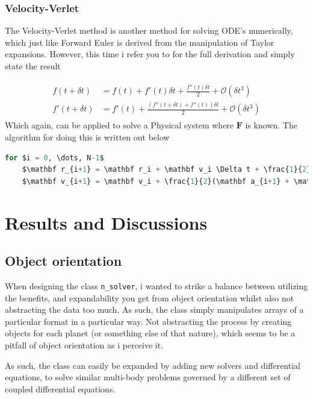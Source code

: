 \documentclass[10pt,showpacs,preprintnumbers,footinbib,amsmath,amssymb,aps,prl,twocolumn,groupedaddress,superscriptaddress,showkeys]{revtex4-1}
\begin{document}
  \subsubsection{Velocity-Verlet}
    The Velocity-Verlet method is another method for solving ODE's numerically, which just like Forward Euler is derived from the manipulation of Taylor expansions. However, this time i refer you to \cite{ode_lecture} for the full derivation and simply state the result

    \begin{align}
      \begin{split}
        f(t + \delta t) &= f(t) + f'(t)\delta t + \frac{f''(t)\delta t}{2} + \mathcal O(\delta t^3) \\
        f'(t + \delta t) &= f'(t) + \frac{\left( f''(t + \delta t) + f''(t) \right)\delta t}{2} + \mathcal O(\delta t^3)
      \end{split}
    \end{align}
    Which again, can be applied to solve a Physical system where $\mathbf F$ is known. The algorithm for doing this is written out below
  \begin{lstlisting}[mathescape=true, language=python, title=Velocity-Verlet Algorithm]
  for $i = 0, \dots, N-1$
    $\mathbf r_{i+1} = \mathbf r_i + \mathbf v_i \Delta t + \frac{1}{2}\mathbf a_i(\Delta t)^2$
    $\mathbf v_{i+1} = \mathbf v_i + \frac{1}{2}(\mathbf a_{i+1} + \mathbf a_i)\Delta t  $
  \end{lstlisting}



\section{Results and Discussions}
  \subsection{Object orientation}
    When designing the class \lstinline{n_solver}, i wanted to strike a balance between utilizing the benefits, and expandability you get from object orientation whilst also not abstracting the data too much. As such, the class simply manipulates arrays of a particular format in a particular way. Not abstracting the process by creating objects for each planet (or something else of that nature), which seems to be a pitfall of object orientation as i perceive it.

    As such, the class can easily be expanded by adding new solvers and differential equations, to solve similar multi-body problems governed by a different set of coupled differential equations.
\end{document}
